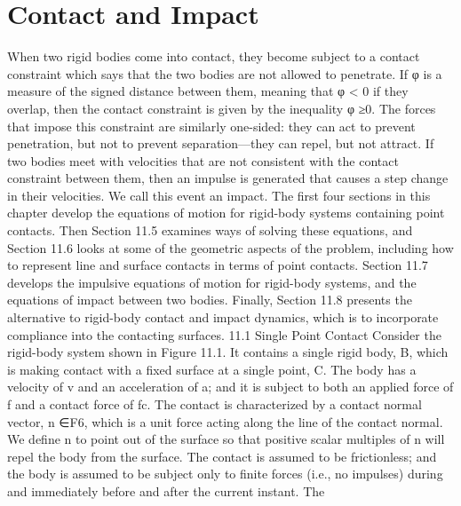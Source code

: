 \chapter{Contact and Impact}
\label{chap:11}
When two rigid bodies come into contact, they become subject to a contact constraint which says that the two bodies are not allowed to penetrate. If φ is a measure of the signed distance between them, meaning that φ < 0 if they overlap, then the contact constraint is given by the inequality φ ≥0. The forces that impose this constraint are similarly one-sided: they can act to prevent penetration, but not to prevent separation—they can repel, but not attract. If two bodies meet with velocities that are not consistent with the contact constraint between them, then an impulse is generated that causes a step change in their velocities. We call this event an impact. The first four sections in this chapter develop the equations of motion for rigid-body systems containing point contacts. Then Section 11.5 examines ways of solving these equations, and Section 11.6 looks at some of the geometric aspects of the problem, including how to represent line and surface contacts in terms of point contacts. Section 11.7 develops the impulsive equations of motion for rigid-body systems, and the equations of impact between two bodies. Finally, Section 11.8 presents the alternative to rigid-body contact and impact dynamics, which is to incorporate compliance into the contacting surfaces. 11.1 Single Point Contact Consider the rigid-body system shown in Figure 11.1. It contains a single rigid body, B, which is making contact with a fixed surface at a single point, C. The body has a velocity of v and an acceleration of a; and it is subject to both an applied force of f and a contact force of fc. The contact is characterized by a contact normal vector, n ∈F6, which is a unit force acting along the line of the contact normal. We define n to point out of the surface so that positive scalar multiples of n will repel the body from the surface. The contact is assumed to be frictionless; and the body is assumed to be subject only to finite forces (i.e., no impulses) during and immediately before and after the current instant. The

